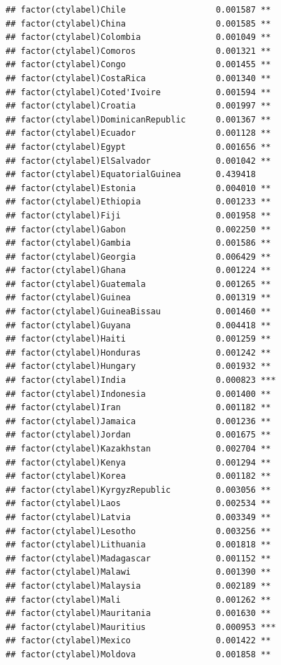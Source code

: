 \documentclass[12pt]{article}\usepackage[]{graphicx}\usepackage[]{color}
\makeatletter
\newenvironment{kframe}{%
 \def\at@end@of@kframe{}%
 \ifinner\ifhmode%
  \def\at@end@of@kframe{\end{minipage}}%
  \begin{minipage}{\columnwidth}%
 \fi\fi%
 \def\FrameCommand##1{\hskip\@totalleftmargin \hskip-\fboxsep
 \colorbox{shadecolor}{##1}\hskip-\fboxsep
     \hskip-\linewidth \hskip-\@totalleftmargin \hskip\columnwidth}%
 \MakeFramed {\advance\hsize-\width
   \@totalleftmargin\z@ \linewidth\hsize
   \@setminipage}}%
 {\par\unskip\endMakeFramed%
 \at@end@of@kframe}
\newenvironment{knitrout}{}{} %
\makeatother
\begin{document}
\begin{knitrout}
\begin{kframe}
\begin{verbatim}
## factor(ctylabel)Chile                  0.001587 ** 
## factor(ctylabel)China                  0.001585 ** 
## factor(ctylabel)Colombia               0.001049 ** 
## factor(ctylabel)Comoros                0.001321 ** 
## factor(ctylabel)Congo                  0.001455 ** 
## factor(ctylabel)CostaRica              0.001340 ** 
## factor(ctylabel)Coted'Ivoire           0.001594 ** 
## factor(ctylabel)Croatia                0.001997 ** 
## factor(ctylabel)DominicanRepublic      0.001367 ** 
## factor(ctylabel)Ecuador                0.001128 ** 
## factor(ctylabel)Egypt                  0.001656 ** 
## factor(ctylabel)ElSalvador             0.001042 ** 
## factor(ctylabel)EquatorialGuinea       0.439418    
## factor(ctylabel)Estonia                0.004010 ** 
## factor(ctylabel)Ethiopia               0.001233 ** 
## factor(ctylabel)Fiji                   0.001958 ** 
## factor(ctylabel)Gabon                  0.002250 ** 
## factor(ctylabel)Gambia                 0.001586 ** 
## factor(ctylabel)Georgia                0.006429 ** 
## factor(ctylabel)Ghana                  0.001224 ** 
## factor(ctylabel)Guatemala              0.001265 ** 
## factor(ctylabel)Guinea                 0.001319 ** 
## factor(ctylabel)GuineaBissau           0.001460 ** 
## factor(ctylabel)Guyana                 0.004418 ** 
## factor(ctylabel)Haiti                  0.001259 ** 
## factor(ctylabel)Honduras               0.001242 ** 
## factor(ctylabel)Hungary                0.001932 ** 
## factor(ctylabel)India                  0.000823 ***
## factor(ctylabel)Indonesia              0.001400 ** 
## factor(ctylabel)Iran                   0.001182 ** 
## factor(ctylabel)Jamaica                0.001236 ** 
## factor(ctylabel)Jordan                 0.001675 ** 
## factor(ctylabel)Kazakhstan             0.002704 ** 
## factor(ctylabel)Kenya                  0.001294 ** 
## factor(ctylabel)Korea                  0.001182 ** 
## factor(ctylabel)KyrgyzRepublic         0.003056 ** 
## factor(ctylabel)Laos                   0.002534 ** 
## factor(ctylabel)Latvia                 0.003349 ** 
## factor(ctylabel)Lesotho                0.003256 ** 
## factor(ctylabel)Lithuania              0.001818 ** 
## factor(ctylabel)Madagascar             0.001152 ** 
## factor(ctylabel)Malawi                 0.001390 ** 
## factor(ctylabel)Malaysia               0.002189 ** 
## factor(ctylabel)Mali                   0.001262 ** 
## factor(ctylabel)Mauritania             0.001630 ** 
## factor(ctylabel)Mauritius              0.000953 ***
## factor(ctylabel)Mexico                 0.001422 ** 
## factor(ctylabel)Moldova                0.001858 ** 

\end{verbatim}
\end{kframe}
\end{knitrout}
\end{document}
